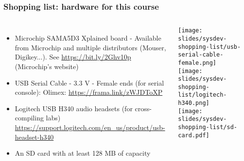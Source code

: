 \begin{frame}
\frametitle{Shopping list: hardware for this course}
  \begin{columns}
    \footnotesize
    \begin{itemize}
      \item Microchip SAMA5D3 Xplained board - Available from Microchip and
	    multiple distributors (Mouser, Digikey...).
	    See \url{https://bit.ly/2Ghv10p} (Microchip's website)
      \item USB Serial Cable - 3.3 V - Female ends (for serial console):
	    Olimex: \url{https://frama.link/zWJDToXP} \\
      \item Logitech USB H340 audio headsets (for cross-compiling labs)
	    \url{https://support.logitech.com/en_us/product/usb-headset-h340}
      \item An SD card with at least 128 MB of capacity
    \end{itemize}
    \texttt{[image: slides/sysdev-shopping-list/usb-serial-cable-female.png]} \\
    \vspace{1cm}
    \texttt{[image: slides/sysdev-shopping-list/logitech-h340.png]} \\
    \vspace{1cm}
    \texttt{[image: slides/sysdev-shopping-list/sd-card.pdf]}
  \end{columns}
\end{frame}

